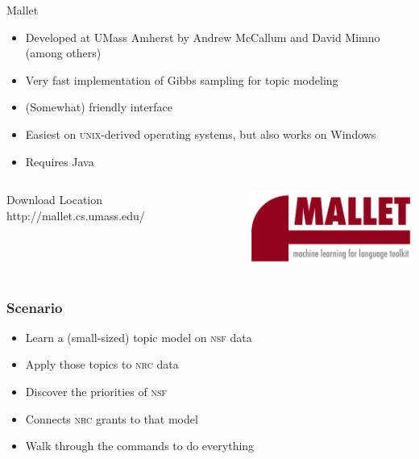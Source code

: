 

\begin{frame}{Mallet}

\begin{itemize}
  \item Developed at UMass Amherst by Andrew McCallum and David Mimno (among others)
  \item Very fast implementation of Gibbs sampling for topic modeling
  \item (Somewhat) friendly interface
  \item Easiest on \textsc{unix}-derived operating systems, but also works on Windows
  \item Requires Java
\end{itemize}

\begin{columns}
\begin{block}{Download Location}
  http://mallet.cs.umass.edu/
\end{block}
\includegraphics[width=.9\linewidth]{topic_models/mallet}
\end{columns}
\end{frame}


\begin{frame}
  \frametitle{Scenario}

  \begin{itemize}
    \item Learn a (small-sized) topic model on \textsc{nsf} data
    \item Apply those topics to \textsc{nrc} data
    \item Discover the priorities of \textsc{nsf}
    \item Connects \textsc{nrc} grants to that model
    \item Walk through the commands to do everything
  \end{itemize}
\end{frame}

